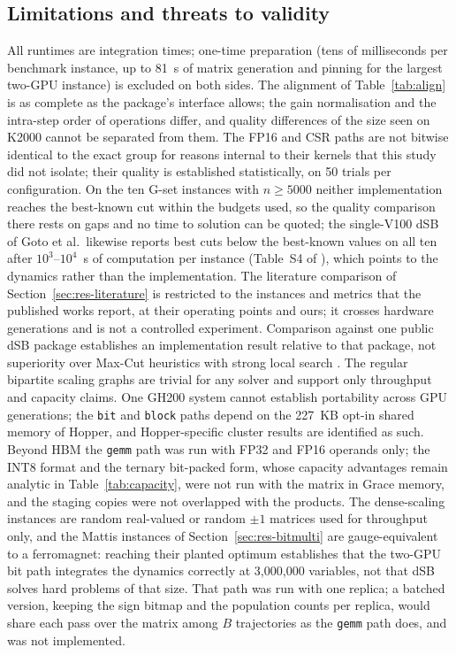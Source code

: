 \documentclass[11pt,a4paper]{article}
\newcommand{\code}[1]{\texttt{#1}}
\begin{document}
\subsection{Limitations and threats to validity}
All runtimes are integration times; one-time preparation (tens of milliseconds per benchmark instance, up to 81~s of matrix generation and pinning for the largest two-GPU instance) is excluded on both sides. The alignment of Table~\ref{tab:align} is as complete as the package's interface allows; the gain normalisation and the intra-step order of operations differ, and quality differences of the size seen on K2000 cannot be separated from them. The FP16 and CSR paths are not bitwise identical to the exact group for reasons internal to their kernels that this study did not isolate; their quality is established statistically, on 50 trials per configuration. On the ten G-set instances with $n\ge5000$ neither implementation reaches the best-known cut within the budgets used, so the quality comparison there rests on gaps and no time to solution can be quoted; the single-V100 dSB of Goto et al.\ likewise reports best cuts below the best-known values on all ten after $10^{3}$--$10^{4}$~s of computation per instance (Table~S4 of \cite{goto2021}), which points to the dynamics rather than the implementation. The literature comparison of Section~\ref{sec:res-literature} is restricted to the instances and metrics that the published works report, at their operating points and ours; it crosses hardware generations and is not a controlled experiment. Comparison against one public dSB package establishes an implementation result relative to that package, not superiority over Max-Cut heuristics with strong local search \cite{benlic2013,dunning2018}. The regular bipartite scaling graphs are trivial for any solver and support only throughput and capacity claims. One GH200 system cannot establish portability across GPU generations; the \code{bit} and \code{block} paths depend on the 227~KB opt-in shared memory of Hopper, and Hopper-specific cluster results are identified as such. Beyond HBM the \code{gemm} path was run with FP32 and FP16 operands only; the INT8 format and the ternary bit-packed form, whose capacity advantages remain analytic in Table~\ref{tab:capacity}, were not run with the matrix in Grace memory, and the staging copies were not overlapped with the products. The dense-scaling instances are random real-valued or random $\pm1$ matrices used for throughput only, and the Mattis instances of Section~\ref{sec:res-bitmulti} are gauge-equivalent to a ferromagnet: reaching their planted optimum establishes that the two-GPU bit path integrates the dynamics correctly at 3,000,000 variables, not that dSB solves hard problems of that size. That path was run with one replica; a batched version, keeping the sign bitmap and the population counts per replica, would share each pass over the matrix among $B$ trajectories as the \code{gemm} path does, and was not implemented.
\end{document}
